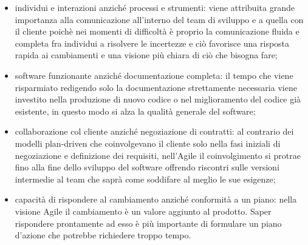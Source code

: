 \documentclass[target=bach,aauheader=,style=]{thud}
\begin{document}
\begin{itemize}
    \item individui e interazioni anziché processi e strumenti: viene attribuita grande importanza alla comunicazione all'interno del
    team di sviluppo e a quella con il cliente poichè nei momenti di difficoltà è proprio la comunicazione fluida e completa fra individui
    a risolvere le incertezze e ciò favorisce una risposta rapida ai cambiamenti e una visione più chiara di ciò che bisogna fare;
    \item software funzionante anziché documentazione completa: il tempo che viene risparmiato redigendo solo la documentazione strettamente
    necessaria viene investito nella produzione di nuovo codice o nel miglioramento del codice già esistente, in questo modo si alza
    la qualità generale del software;
    \item collaborazione col cliente anziché negoziazione di contratti: al contrario dei modelli plan-driven che coinvolgevano il cliente
    solo nella fasi iniziali di negoziazione e definizione dei requisiti, nell'Agile il coinvolgimento si protrae fino alla fine dello sviluppo
    del software offrendo riscontri sulle versioni intermedie al team che saprà come soddifare al meglio le sue esigenze;
    \item capacità di rispondere al cambiamento anziché conformità a un piano: nella visione Agile il cambiamento è un valore aggiunto al
    prodotto. Saper rispondere prontamente ad esso è più importante di formulare un piano d'azione che potrebbe richiedere troppo tempo.
\end{itemize}
\end{document}
